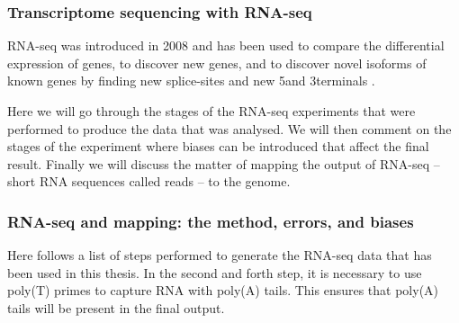%
\subsubsection{Transcriptome sequencing with RNA-seq}
RNA-seq was introduced in 2008 \cite{nagalakshmi_transcriptional_2008} and has
been used to compare the differential expression of genes, to discover new
genes, and to discover novel isoforms of known genes by finding new
splice-sites and new 5\ppp and 3\ppp terminals \cite{wang_rna-seq:_2009}.

Here we will go through the stages of the RNA-seq experiments that were
performed to produce the data that was analysed. We will then comment on the
stages of the experiment where biases can be introduced that affect the final
result. Finally we will discuss the matter of mapping the output of RNA-seq --
short RNA sequences called reads -- to the genome.

\subsubsection{RNA-seq and mapping: the method, errors, and biases}

Here follows a list of steps performed to generate the RNA-seq data that has
been used in this thesis. In the second and forth step, it is necessary to use
poly(T) primes to capture RNA with poly(A) tails. This ensures that poly(A)
tails will be present in the final output.

